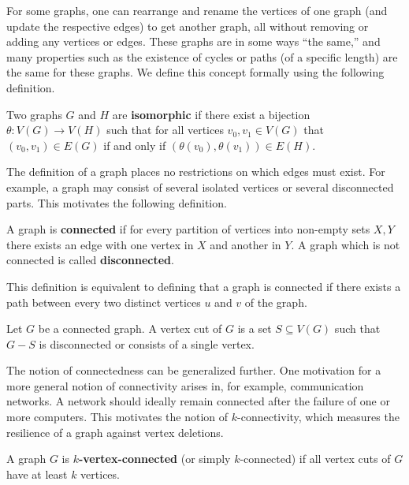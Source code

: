 For some graphs, one can rearrange and rename the vertices of one graph (and update the respective edges) to get another graph, all without removing or adding any vertices or edges. These graphs are in some ways ``the same,'' and many properties such as the existence of cycles or paths (of a specific length) are the same for these graphs. We define this concept formally using the following definition.

\begin{definition}[Isomorphism]
  Two graphs $G$ and $H$ are \textbf{isomorphic} if there exist a bijection $\theta : V(G) \rightarrow V(H)$ such that for all vertices $v_0, v_1 \in V(G)$ that $(v_0,v_1) \in E(G)$ if and only if $(\theta(v_0),\theta(v_1)) \in E(H)$.
\end{definition}

The definition of a graph places no restrictions on which edges must exist. For example, a graph may consist of several isolated vertices or several disconnected parts. This motivates the following definition.

\begin{definition}[Connected]
  A graph is \textbf{connected} if for every partition of vertices into non-empty sets $X, Y$ there exists an edge with one vertex in $X$ and another in $Y$. A graph which is not connected is called \textbf{disconnected}.
\end{definition}

This definition is equivalent to defining that a graph is connected if there exists a path between every two distinct vertices $u$ and $v$ of the graph.

\begin{definition}
  Let $G$ be a connected graph. A vertex cut of $G$ is a set $S \subseteq V(G)$ such that $G - S$ is disconnected or consists of a single vertex.
\end{definition}

The notion of connectedness can be generalized further. One motivation for a more general notion of connectivity arises in, for example, communication networks. A network should ideally remain connected after the failure of one or more computers. This motivates the notion of $k$-connectivity, which measures the resilience of a graph against vertex deletions.

\begin{definition}[$k$-connected]
  A graph $G$ is \textbf{$k$-vertex-connected} (or simply $k$-connected) if all vertex cuts of $G$ have at least $k$ vertices.
\end{definition}

